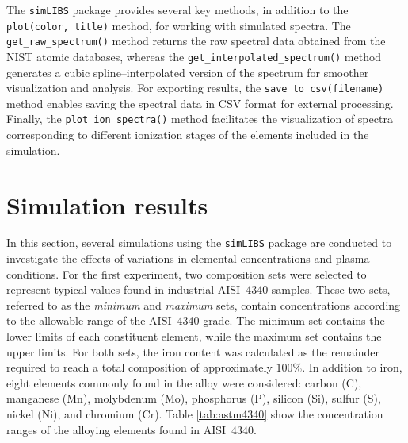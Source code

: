\documentclass[12pt,a4paper]{article}
\begin{document}
		The \texttt{simLIBS} package provides several key methods, in addition to the \texttt{plot(color, title)} method, for working with simulated spectra. 
		The \texttt{get\_raw\_spectrum()} method returns the raw spectral data obtained from the NIST atomic 
		databases, whereas the \texttt{get\_interpolated\_spectrum()} method generates a cubic spline--interpolated 
		version of the spectrum for smoother visualization and analysis. 
		For exporting results, the \texttt{save\_to\_csv(filename)} method enables saving the spectral data 
		in CSV format for external processing. 
		Finally, the \texttt{plot\_ion\_spectra()} method facilitates the visualization of spectra corresponding 
		to different ionization stages of the elements included in the simulation.
		
	\section{Simulation results}
	In this section, several simulations using the \texttt{simLIBS} package are conducted to investigate the effects of variations in elemental concentrations and plasma conditions. For the first experiment, two composition sets were selected to represent typical values found in industrial AISI~4340 samples. These two sets, referred to as the \emph{minimum} and \emph{maximum} sets, contain concentrations according to the allowable range of the AISI~4340 grade. The minimum set contains the lower limits of each constituent element, while the maximum set contains the upper limits. For both sets, the iron content was calculated as the remainder required to reach a total composition of approximately $100\%$. In addition to iron, eight elements commonly found in the alloy were considered: carbon (C), manganese (Mn), molybdenum (Mo), phosphorus (P), silicon (Si), sulfur (S), nickel (Ni), and chromium (Cr). Table \ref{tab:astm4340} show the concentration ranges of the alloying elements found in AISI~4340.
	\begin{table}[htbp]
		\centering
		\caption{AISI 4340 Steel – Chemical Composition}
		\label{tab:astm4340}
	\end{table}
	
\end{document}
